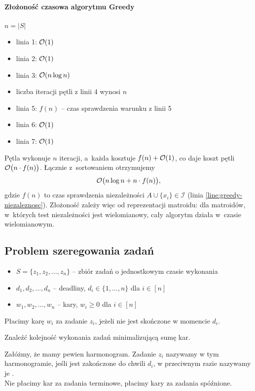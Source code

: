 \paragraph{Złożoność czasowa algorytmu Greedy}
$n = |S|$
\begin{itemize}[nosep]
	\item linia 1: $\mathcal{O}(1)$
	\item linia 2: $\mathcal{O}(1)$
	\item linia 3: $\mathcal{O}(n \log n)$
	\item liczba iteracji pętli z linii 4 wynosi $n$
	\item linia 5: $f(n)$ -- czas sprawdzenia warunku z linii 5
	\item linia 6: $\mathcal{O}(1)$
	\item linia 7: $\mathcal{O}(1)$
\end{itemize}
Pętla wykonuje $n$ iteracji, a~każda kosztuje $f(n) + \mathcal{O}(1)$, co daje koszt pętli $\mathcal{O}\bigl(n \cdot f(n)\bigr)$. Łącznie z~sortowaniem otrzymujemy
\[
	\mathcal{O}\bigl(n \log n + n \cdot f(n)\bigr),
\]
gdzie $f(n)$ to czas sprawdzenia niezależności $A \cup \{x_i\} \in \mathcal{I}$ (linia \ref{line:greedy-niezaleznosc}). Złożoność zależy więc od reprezentacji matroidu: dla matroidów, w~których test niezależności jest wielomianowy, cały algorytm działa w~czasie wielomianowym.

\subsection{Problem szeregowania zadań}

\begin{itemize}[nosep]
	\item $S = \{z_1, z_2, \ldots, z_n\}$ -- zbiór zadań o jednostkowym czasie wykonania
	\item $d_1, d_2, \ldots, d_n$ -- deadliny, $d_i \in \{1, \ldots, n\}$ dla $i \in [n]$
	\item $w_1, w_2, \ldots, w_n$ -- kary, $w_i \geq 0$ dla $i \in [n]$
\end{itemize}
Płacimy karę $w_i$ za zadanie $z_i$, jeżeli nie jest skończone w momencie $d_i$.
\begin{problem}
Znaleźć kolejność wykonania zadań minimalizującą sumę kar.
\end{problem}

Załóżmy, że mamy pewien harmonogram. Zadanie $z_i$ nazywamy  w tym harmonogramie, jeśli jest zakończone do chwili $d_i$, w przeciwnym razie nazywamy je .\\
Nie płacimy kar za zadania terminowe, płacimy kary za zadania spóźnione.


